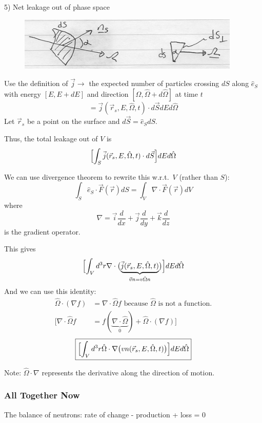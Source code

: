 \documentclass[12pt]{article}
\newcommand{\vOmega}{\ensuremath{\hat{\Omega}}}
\begin{document}
5) Net leakage out of phase space

\begin{figure}[h!]
\begin{center}
\includegraphics[height=1in]{DifferentialArea}
\end{center}
\end{figure}

Use the definition of $\vec{j} \rightarrow$ the expected number of particles crossing $dS$ along $\hat{e}_S$ with energy $[E, E + dE]$ and direction $[\vOmega, \vOmega + d\vOmega]$ at time $t$  
%
\[= \vec{j}(\vec{r}_s, E, \vOmega, t) \cdot d\vec{S} dE d\vOmega\]
%
Let $\vec{r}_s$ be a point on the surface and  $d\vec{S} = \hat{e}_S dS$.

Thus, the total leakage out of $V$ is
\[\Bigl[\int_S \vec{j}(\vec{r}_s, E, \vOmega, t) \cdot d\vec{S} \Bigr] dE d\vOmega \]

We can use divergence theorem to rewrite this w.r.t.\ $V$ (rather than $S$):
\[\int_S \hat{e}_S \cdot \vec{F} (\vec{r}) dS = \int_V \nabla \cdot \vec{F} (\vec{r}) dV\]
where
\[\nabla = \vec{i}\frac{d}{dx} + \vec{j}\frac{d}{dy} + \vec{k}\frac{d}{dz}\]
is the gradient operator.

This gives
\[\Bigl[\int_V d^3r \nabla \cdot \bigl( \underbrace{\vec{j}(\vec{r}_s, E, \vOmega, t)}_{\vec{v}n = v \vOmega n} \bigr) \Bigr] dE d\vOmega \]
%
And we can use this identity:
\begin{align}
%
\vOmega \cdot (\nabla f) &= \nabla \cdot \vOmega f \text{ because }\vOmega\text{ is not a function.} \\
\bigl[\nabla \cdot \vOmega f &= f(\underbrace{\nabla \cdot \vOmega}_{0}) + \vOmega \cdot (\nabla f)\bigr] \nonumber
\end{align}
%
\[ \boxed{\Bigl[\int_V d^3r \vOmega \cdot \nabla \bigl(v n(\vec{r}_s, E, \vOmega, t) \bigr) \Bigr] dE d\vOmega }\]

Note: $\vOmega \cdot \nabla$ represents the derivative along the direction of motion.

\subsubsection{All Together Now}
The balance of neutrons: rate of change - production + loss = 0
\end{document}
